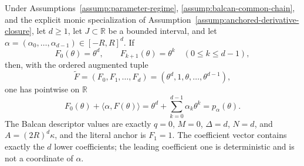 \begin{proposition} \label{prop:step-009-monic-presentation}
Under Assumptions~\ref{assump:parameter-regime}, \ref{assump:balcan-common-chain}, and the explicit monic specialization of Assumption~\ref{assump:anchored-derivative-closure}, let \(d\geq1\), let \(J\subset\mathbb R\) be a bounded interval, and let \(\alpha=(\alpha_0,\ldots,\alpha_{d-1})\in[-R,R]^d\). If
\begin{equation}
\label{eq:appendix-display-250}
F_0(\theta)=\theta^d,
\qquad
F_{k+1}(\theta)=\theta^k\quad(0\leq k\leq d-1),
\end{equation}
then, with the ordered augmented tuple
\begin{equation}
\label{eq:appendix-display-251}
\widetilde F=(F_0,F_1,\ldots,F_d)
=(\theta^d,1,\theta,\ldots,\theta^{d-1}),
\end{equation}
one has pointwise on \(\mathbb R\)
\begin{equation}
\label{eq:appendix-display-252}
F_0(\theta)+\langle\alpha,F(\theta)\rangle
=\theta^d+\sum_{k=0}^{d-1}\alpha_k\theta^k
=p_\alpha(\theta).
\end{equation}
The Balcan descriptor values are exactly \(q=0\), \(M=0\), \(\Delta=d\), \(N=d\), and \(A=(2R)^d\kappa\), and the literal anchor is \(F_1=1\). The coefficient vector contains exactly the \(d\) lower coefficients; the leading coefficient one is deterministic and is not a coordinate of \(\alpha\).


\end{proposition}


